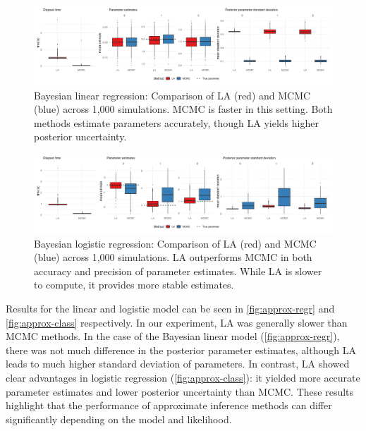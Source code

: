 \begin{figure}[htbp]
    \centering
    \includegraphics[width=\linewidth]{../figures/approx_regr.png}
    \caption{
    Bayesian linear regression: Comparison of LA (red) and MCMC (blue) across 1,000 simulations. MCMC is faster in this setting. Both methods estimate parameters accurately, though LA yields higher posterior uncertainty. 
    }
    \label{fig:approx-regr}
\end{figure}

\begin{figure}[htbp]
    \centering
    \includegraphics[width=\linewidth]{../figures/approx_class.png}
    \caption{
    Bayesian logistic regression: Comparison of LA (red) and MCMC (blue) across 1,000 simulations. LA outperforms MCMC in both accuracy and precision of parameter estimates. While LA is slower to compute, it provides more stable estimates.
    }
    \label{fig:approx-class}
\end{figure}

Results for the linear and logistic model can be seen in \autoref{fig:approx-regr} and \autoref{fig:approx-class} respectively.
In our experiment, LA was generally slower than MCMC methods.
In the case of the Bayesian linear model (\autoref{fig:approx-regr}), there was not much difference in the posterior parameter estimates, although LA leads to much higher standard deviation of parameters.
In contrast, LA showed clear advantages in logistic regression (\autoref{fig:approx-class}): it yielded more accurate parameter estimates and lower posterior uncertainty than MCMC. These results highlight that the performance of approximate inference methods can differ significantly depending on the model and likelihood.


